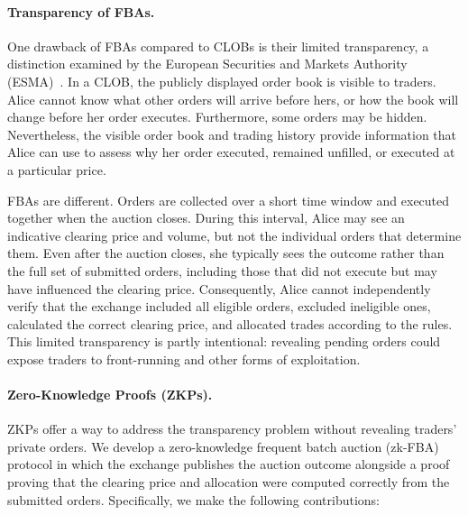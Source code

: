 \paragraph{Transparency of FBAs.} One drawback of FBAs compared to CLOBs is their limited transparency, a distinction examined by the European Securities and Markets Authority (ESMA)~\cite{+esmafba,+esmafbafinal}. In a CLOB, the publicly displayed order book is visible to traders. Alice cannot know what other orders will arrive before hers, or how the book will change before her order executes. Furthermore, some orders may be hidden. Nevertheless, the visible order book and trading history provide information that Alice can use to assess why her order executed, remained unfilled, or executed at a particular price.

FBAs are different. Orders are collected over a short time window and executed together when the auction closes. During this interval, Alice may see an indicative clearing price and volume, but not the individual orders that determine them. Even after the auction closes, she typically sees the outcome rather than the full set of submitted orders, including those that did not execute but may have influenced the clearing price. Consequently, Alice cannot independently verify that the exchange included all eligible orders, excluded ineligible ones, calculated the correct clearing price, and allocated trades according to the rules. This limited transparency is partly intentional: revealing pending orders could expose traders to front-running and other forms of exploitation.

\paragraph{Zero-Knowledge Proofs (ZKPs).} ZKPs offer a way to address the transparency problem without revealing traders' private orders. We develop a zero-knowledge frequent batch auction (zk-FBA) protocol in which the exchange publishes the auction outcome alongside a proof proving that the clearing price and allocation were computed correctly from the submitted orders. Specifically, we make the following contributions:

